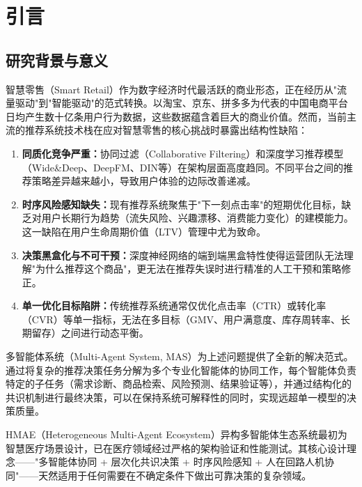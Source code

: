 \documentclass[11pt,a4paper]{ctexart}
\theoremstyle{remark}
\begin{document}
\newpage

\tableofcontents
\newpage

\section{引言}

\subsection{研究背景与意义}

智慧零售（Smart Retail）作为数字经济时代最活跃的商业形态，正在经历从"流量驱动"到"智能驱动"的范式转换。以淘宝、京东、拼多多为代表的中国电商平台日均产生数十亿条用户行为数据，这些数据蕴含着巨大的商业价值。然而，当前主流的推荐系统技术栈在应对智慧零售的核心挑战时暴露出结构性缺陷：

\begin{enumerate}[nosep]
\item \textbf{同质化竞争严重：}协同过滤（Collaborative Filtering）和深度学习推荐模型（Wide\&Deep、DeepFM、DIN等）在架构层面高度趋同。不同平台之间的推荐策略差异越来越小，导致用户体验的边际改善递减。
\item \textbf{时序风险感知缺失：}现有推荐系统聚焦于"下一刻点击率"的短期优化目标，缺乏对用户长期行为趋势（流失风险、兴趣漂移、消费能力变化）的建模能力。这一缺陷在用户生命周期价值（LTV）管理中尤为致命。
\item \textbf{决策黑盒化与不可干预：}深度神经网络的端到端黑盒特性使得运营团队无法理解"为什么推荐这个商品"，更无法在推荐失误时进行精准的人工干预和策略修正。
\item \textbf{单一优化目标陷阱：}传统推荐系统通常仅优化点击率（CTR）或转化率（CVR）等单一指标，无法在多目标（GMV、用户满意度、库存周转率、长期留存）之间进行动态平衡。
\end{enumerate}

多智能体系统（Multi-Agent System, MAS）为上述问题提供了全新的解决范式。通过将复杂的推荐决策任务分解为多个专业化智能体的协同工作，每个智能体负责特定的子任务（需求诊断、商品检索、风险预测、结果验证等），并通过结构化的共识机制进行最终决策，可以在保持系统可解释性的同时，实现远超单一模型的决策质量。

HMAE（Heterogeneous Multi-Agent Ecosystem）异构多智能体生态系统最初为智慧医疗场景设计，已在医疗领域经过严格的架构验证和性能测试。其核心设计理念——"多智能体协同 + 层次化共识决策 + 时序风险感知 + 人在回路人机协同"——天然适用于任何需要在不确定条件下做出可靠决策的复杂领域。
\end{document}
